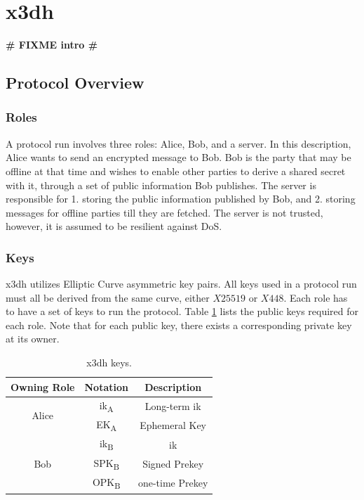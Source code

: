 \section{\acrfull*{x3dh}}
\textbf{\LARGE \# FIXME intro \#}
\label{ch:x3dh}

\subsection{Protocol Overview}
\subsubsection{Roles}
A protocol run involves three roles: Alice, Bob, and a server. In this description, Alice wants to send an encrypted message to Bob. Bob is the party that may be offline at that time and wishes to enable other parties to derive a shared secret with it, through a set of public information Bob publishes. The server is responsible for 1. storing the public information published by Bob, and 2. storing messages for offline parties till they are fetched. The server is not trusted, however, it is assumed to be resilient against DoS. %
\subsubsection{Keys}
\gls{x3dh} utilizes Elliptic Curve asymmetric key pairs. All keys used in a protocol run must all be derived from the same curve, either $X25519$ or $X448$. Each role has to have a set of keys to run the protocol. Table \ref{tab:x3dhkeys} lists the public keys required for each role. Note that for each public key, there exists a corresponding private key at its owner.

\begin{table}
	\centering
	\begin{tabular}{|c|c|c|}
		
		\hline
	\rowcolor[rgb]{ .745,  .804,  .843}
		Owning Role 			 & Notation							 & Description 			  \\ \hline\hline
		\multirow{2}{*}{Alice} 	 & \acrshort{ik}\textsubscript{A} 	 & Long-term \acrlong{ik} \\
							     & EK\textsubscript{A} 	     		 & Ephemeral Key 		  \\\hline
		\multirow{3}{*}{Bob} 	 & \acrshort{ik}\textsubscript{B} 	 & \acrlong{ik} 		  \\
								 & SPK\textsubscript{B} 			 & Signed Prekey 		  \\
							     & OPK\textsubscript{B} 	 		 & one-time Prekey 		  \\ \hline
		
	\end{tabular}
	\caption{\gls{x3dh} keys.}
	\label{tab:x3dhkeys}
\end{table}

